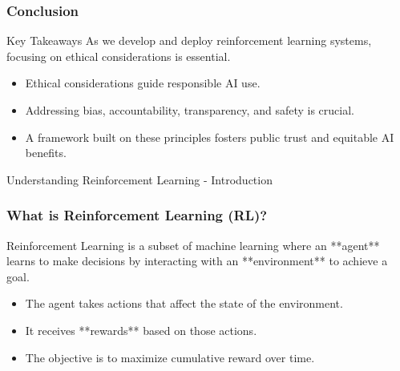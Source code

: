 \documentclass[aspectratio=169]{beamer}
\begin{document}
\begin{frame}[fragile]
    \frametitle{Conclusion}
    \begin{block}{Key Takeaways}
        As we develop and deploy reinforcement learning systems, focusing on ethical considerations is essential. 
        \begin{itemize}
            \item Ethical considerations guide responsible AI use.
            \item Addressing bias, accountability, transparency, and safety is crucial.
            \item A framework built on these principles fosters public trust and equitable AI benefits.
        \end{itemize}
    \end{block}
\end{frame}

\begin{frame}[fragile]{Understanding Reinforcement Learning - Introduction}
    \frametitle{What is Reinforcement Learning (RL)?}
    Reinforcement Learning is a subset of machine learning where an **agent** learns to make decisions by interacting with an **environment** to achieve a goal. 
    \begin{itemize}
        \item The agent takes actions that affect the state of the environment.
        \item It receives **rewards** based on those actions.
        \item The objective is to maximize cumulative reward over time.
    \end{itemize}
\end{frame}
\end{document}
